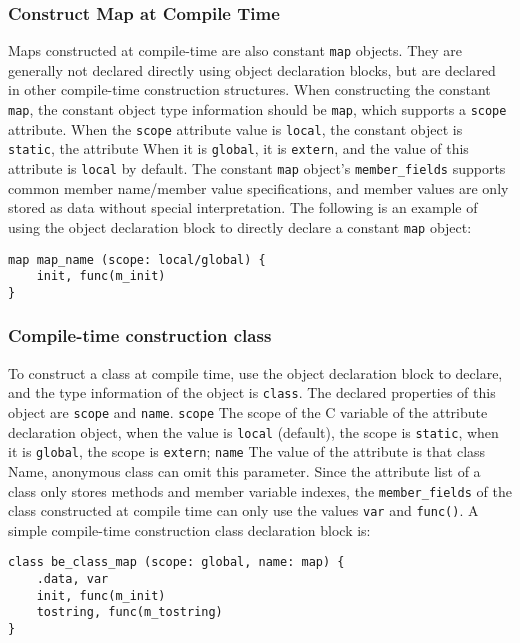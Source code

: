\subsubsection {Construct Map at Compile Time}

Maps constructed at compile-time are also constant \texttt{map} objects. They are generally not declared directly using object declaration blocks, but are declared in other compile-time construction structures. When constructing the constant \texttt{map}, the constant object type information should be \texttt{map}, which supports a \texttt{scope} attribute. When the \texttt{scope} attribute value is \texttt{local}, the constant object is \texttt{static}, the attribute When it is \texttt{global}, it is \texttt{extern}, and the value of this attribute is \texttt{local} by default. The constant \texttt{map} object's \texttt{member\_fields} supports common member name/member value specifications, and member values   are only stored as data without special interpretation. The following is an example of using the object declaration block to directly declare a constant \texttt{map} object:
\begin{lstlisting}
map map_name (scope: local/global) {
    init, func(m_init)
}
\end{lstlisting}

\subsubsection{Compile-time construction class}

To construct a class at compile time, use the object declaration block to declare, and the type information of the object is \texttt{class}. The declared properties of this object are \texttt{scope} and \texttt{name}. \texttt{scope} The scope of the C variable of the attribute declaration object, when the value is \texttt{local} (default), the scope is \texttt{static}, when it is \texttt{global}, the scope is \texttt{extern}; \texttt{name} The value of the attribute is that class Name, anonymous class can omit this parameter. Since the attribute list of a class only stores methods and member variable indexes, the \texttt{member\_fields} of the class constructed at compile time can only use the values   \texttt{var} and \texttt{func()}. A simple compile-time construction class declaration block is:
\begin{lstlisting}
class be_class_map (scope: global, name: map) {
    .data, var
    init, func(m_init)
    tostring, func(m_tostring)
}
\end{lstlisting}

